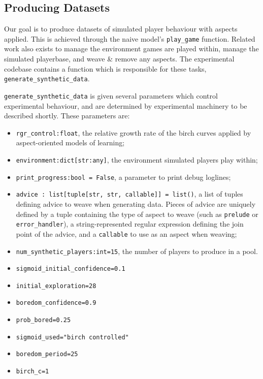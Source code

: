 \subsection{Producing Datasets}\label{subsec:exp1_producing_datasets}


Our goal is to produce datasets of simulated player behaviour with aspects
applied. This is achieved through the naive model's \lstinline{play_game}
function. Related work also exists to manage the environment games are played
within, manage the simulated playerbase, and weave \& remove any aspects. The
experimental codebase contains a function which is responsible for these tasks,
\lstinline{generate_synthetic_data}.

\lstinline{generate_synthetic_data} is given several parameters which control
experimental behaviour, and are determined by experimental machinery to be
described shortly. These parameters are:
\begin{itemize}
  \item \lstinline{rgr_control:float}, the relative growth rate of the birch curves
  applied by aspect-oriented models of learning;
  \item \lstinline{environment:dict[str:any]}, the environment simulated players play within;
  \item \lstinline{print_progress:bool = False}, a parameter to print debug loglines;
  \item \lstinline{advice : list[tuple[str, str, callable]] = list()}, a list of
  tuples defining advice to weave when generating data. Pieces of advice are
  uniquely defined by a tuple containing the type of aspect to weave (such as
  \lstinline{prelude} or \lstinline{error_handler}), a string-represented
  regular expression defining the join point of the advice, and a
  \lstinline{callable} to use as an aspect when weaving;
  \item \lstinline{num_synthetic_players:int=15}, the number of players to
  produce in a pool. 
  \item \lstinline{sigmoid_initial_confidence=0.1}
  \item \lstinline{initial_exploration=28}
  \item \lstinline{boredom_confidence=0.9}
  \item \lstinline{prob_bored=0.25}
  \item \lstinline{sigmoid_used="birch controlled"}
  \item \lstinline{boredom_period=25}
  \item \lstinline{birch_c=1}
\end{itemize}


